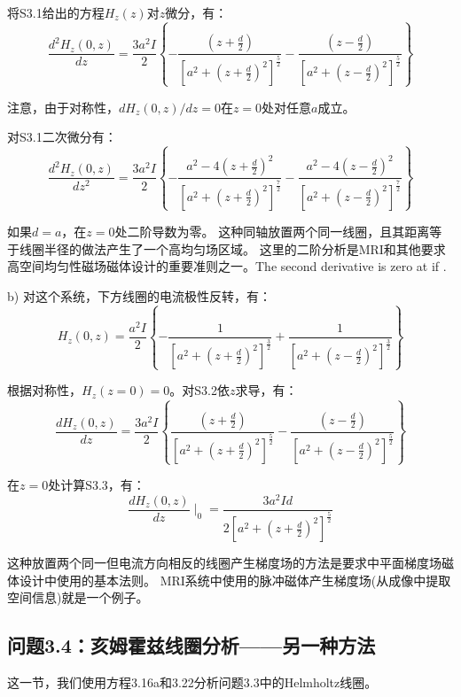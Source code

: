 将S3.1给出的方程$H_z(z)$对$z$微分，有：
\begin{equation}
\frac{d^2H_z(0,z)}{dz}=\frac{3a^2I}{2}\left\{{-\frac{(z+\frac{d}{2})}{[a^2+(z+\frac{d}{2})^2]^\frac{5}{2}}-\frac{(z-\frac{d}{2})}{[a^2+(z-\frac{d}{2})^2]^\frac{5}{2}}}\right\}
\end{equation}

注意，由于对称性，$dH_z(0,z)/dz=0$在$z=0$处对任意$a$成立。

对S3.1二次微分有：
\begin{equation}
\frac{d^2H_z(0,z)}{dz^2}=\frac{3a^2I}{2}\left\{{-\frac{a^2-4(z+\frac{d}{2})^2}{[a^2+(z+\frac{d}{2})^2]^\frac{7}{2}}}
-\frac{a^2-4(z-\frac{d}{2})^2}{[a^2+(z-\frac{d}{2})^2]^\frac{7}{2}}\right\}
\end{equation}

如果$d = a$，在$z = 0$处二阶导数为零。
这种同轴放置两个同一线圈，且其距离等于线圈半径的做法产生了一个高均匀场区域。
这里的二阶分析是MRI和其他要求高空间均匀性磁场磁体设计的重要准则之一。The second derivative is zero at  if . 

b) 对这个系统，下方线圈的电流极性反转，有：
\begin{equation}%
H_z(0,z)=\frac{a^2I}{2}\left\{{-\frac{1}{[a^2+(z+\frac{d}{2})^2]^\frac{3}{2}}+\frac{1}{[a^2+(z-\frac{d}{2})^2]^\frac{3}{2}}}\right\}
\end{equation}

根据对称性，$H_z(z=0)=0$。对S3.2依$z$求导，有：
\begin{equation}%
\frac{dH_z(0,z)}{dz}=\frac{3a^2I}{2}\left\{{\frac{(z+\frac{d}{2})}{[a^2+(z+\frac{d}{2})^2]^\frac{5}{2}}-\frac{(z-\frac{d}{2})}{[a^2+(z-\frac{d}{2})^2]^\frac{5}{2}}}\right\}
\end{equation}

在$z=0$处计算S3.3，有：
\begin{equation}
\frac{dH_z(0,z)}{dz}\mid_0=\frac{3a^2Id}{2[a^2+(z+\frac{d}{2})^2]^\frac{5}{2}}
\end{equation}

这种放置两个同一但电流方向相反的线圈产生梯度场的方法是要求中平面梯度场磁体设计中使用的基本法则。
MRI系统中使用的脉冲磁体产生梯度场(从成像中提取空间信息)就是一个例子。
\newpage

\subsection{问题3.4：亥姆霍兹线圈分析——另一种方法}
这一节，我们使用方程3.16a和3.22分析问题3.3中的Helmholtz线圈。

